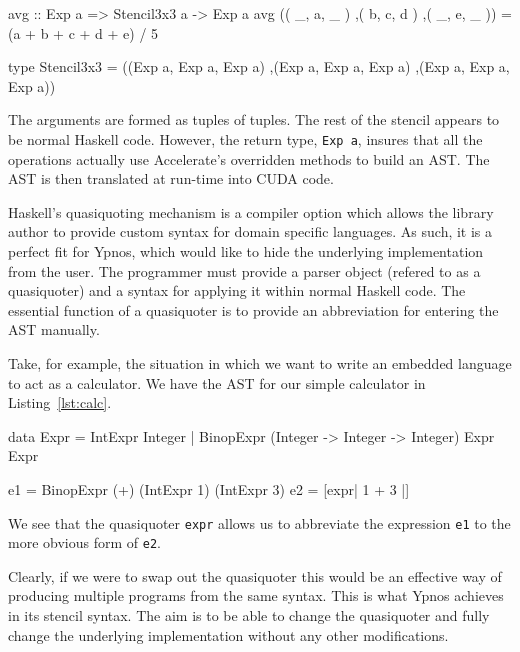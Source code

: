 \documentclass[12pt,a4paper,oneside]{scrbook}
\begin{document}
\begin{hflisting}[label={lst:ypsten}, caption=The ``average'' stencil defined
  using Accelerate's syntax.]
avg :: Exp a => Stencil3x3 a -> Exp a
avg (( _, a, _ )
    ,( b, c, d )
    ,( _, e, _ )) = (a + b + c + d + e) / 5

type Stencil3x3 = ((Exp a, Exp a, Exp a)
                  ,(Exp a, Exp a, Exp a)
                  ,(Exp a, Exp a, Exp a))
\end{hflisting}

The arguments are formed as tuples of tuples. The rest of the stencil appears to
be normal Haskell code. However, the return type, \texttt{Exp a}, insures that
all the operations actually use Accelerate's overridden methods to build an
AST. The AST is then translated at run-time into CUDA code.

Haskell's quasiquoting mechanism is a compiler option which allows the library
author to provide custom syntax for domain specific languages.  As such, it is a
perfect fit for Ypnos, which would like to hide the underlying implementation
from the user. The programmer must provide a parser object (refered to as a
quasiquoter) and a syntax for applying it within normal Haskell code. The
essential function of a quasiquoter is to provide an abbreviation for entering
the AST manually.

Take, for example, the situation in which we want to write an embedded
language to act as a calculator. We have the AST for our
simple calculator in Listing~\ref{lst:calc}.

\begin{hflisting}[label={lst:calc}, caption={A simple calculator defined using an
  AST (\texttt{Expr}) and using a quasiquoter for abbreviated syntax. The definition of
  \texttt{expr} is omitted.}]
data Expr  =  IntExpr Integer
           |  BinopExpr (Integer -> Integer -> Integer) Expr Expr

e1 = BinopExpr (+) (IntExpr 1) (IntExpr 3)
e2 = [expr| 1 + 3 |]
\end{hflisting}

We see that the quasiquoter \texttt{expr} allows us to abbreviate the expression
\texttt{e1} to the more obvious form of \texttt{e2}.

Clearly, if we were to swap out the quasiquoter this would be an
effective way of producing multiple programs from the same syntax. This
is what Ypnos achieves in its stencil syntax. The aim is to be able to
change the quasiquoter and fully change the underlying implementation
without any other modifications.
\end{document}
